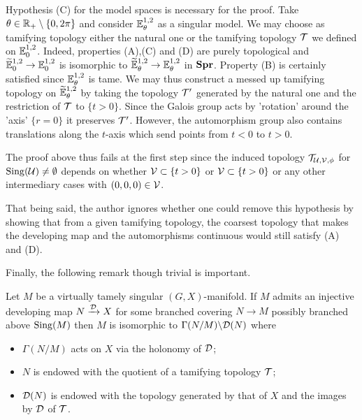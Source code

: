 \begin{rem}   Hypothesis (C) for the model spaces is necessary for the proof.  Take $\theta \in \mathbb R_+\setminus \{0,2\pi\}$ and consider ${\mathbb E}^{1,2}_{\theta}$ as a singular model.
We may choose as tamifying topology either the natural one or the tamifying topology $\mathcal{T}$ we defined on ${\mathbb E}^{1,2}_{0}$. Indeed, properties (A),(C) and (D) are purely topological and ${\widetilde {\mathbb{E}}}^{1,2}_0 \rightarrow \mathbb{E}^{1,2}_0$ is isomorphic to $\widetilde {\mathbb{E}}_\theta^{1,2}\rightarrow {\mathbb E}^{1,2}_{\theta}$ in $\mathbf{Spr}$. 
Property (B) is certainly satisfied since ${\mathbb E}^{1,2}_{\theta}$ is tame.
We may thus construct a messed up tamifying topology on $\widetilde {\mathbb{E}}_\theta^{1,2}$ by taking the topology $\mathcal{T}'$ generated by the natural one and the restriction of $\mathcal{T}$ to $\{t>0\}$. Since  the Galois group acts by 'rotation' around the 'axis' $\{r=0\}$ it preserves $\mathcal{T}'$. However, the automorphism group also contains translations along the $t$-axis which send points from $t<0$ to $t>0$. 

The proof above thus fails at the first step since the induced topology $\mathcal{T}_{\mathcal{U},\mathcal V,\phi}$ for $\mathrm{Sing}(\mathcal{U})\neq\emptyset$ depends on whether $\mathcal V\subset \{t>0\}$ or $\mathcal V \subset \{t>0\}$ or any other intermediary cases with $(0,0,0)\in \mathcal V$.



That being said, the author ignores whether one could remove this hypothesis by showing that from  a given tamifying topology, the coarsest topology that makes the developing map and the automorphisms continuous would still satisfy (A) and (D).


\end{rem}



 Finally, the following remark though trivial is important.
 \begin{rem}\label{rem:quotient_virtually_tame} Let $M$ be a virtually tamely singular $(G,X)$-manifold. If $M$ admits an injective developing map $N\xrightarrow{\mathcal{D}}X$ for some branched covering $N\rightarrow M$ possibly branched above $\mathrm{Sing}(M)$ then $M$ is isomorphic to $\Gamma(N/M)\backslash\mathcal{D}(N)$ where 
 \begin{itemize}
  \item $\Gamma(N/M)$ acts on $X$ via the holonomy of $\mathcal{D}$;
  \item $N$ is endowed with the quotient of a tamifying topology $\mathcal{T}$;
  \item $\mathcal{D}(N)$ is endowed with the topology generated by that of $X$ and the images by $\mathcal{D}$ of $\mathcal{T}$.
 \end{itemize} 
 \end{rem}


